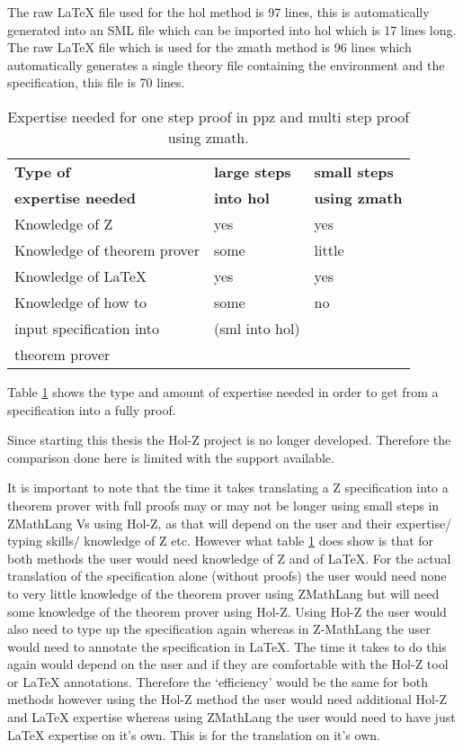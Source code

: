 The raw \LaTeX{} file used for the \gls{hol} method is 97 lines, this is
automatically generated into an SML file which can be imported into \gls{hol}
which is 17 lines long. The raw \LaTeX{} file which is used for the \gls{zmath}
method is 96 lines which automatically generates a single theory file containing
the environment and the specification, this file is 70 lines.

\begin{table}[H]
\begin{center}
\begin{tabular}{| l | l | l |}
\hline
\textbf{Type of} & \textbf{large steps} & \textbf{small steps} \\
\textbf{expertise needed} & \textbf{into \gls{hol}} & \textbf{using \gls{zmath}}
\\
\hline
\hline
Knowledge of Z &  yes & yes \\
\hline
Knowledge of theorem prover & some & little \\
\hline
Knowledge of \LaTeX & yes & yes \\
\hline
Knowledge of how to & some & no \\
input specification into &(sml into \gls{hol})&  \\
theorem prover &  &  \\
\hline
\end{tabular}
\end{center}
\caption{Expertise needed for one step proof in \gls{ppz} and multi step proof using \gls{zmath}.}
\label{tab:expertisebb}
\end{table}

Table \ref{tab:expertisebb} shows the type and amount of expertise needed in
order to get from a specification into a fully proof.

Since starting this thesis the Hol-Z project is no longer developed. Therefore the
comparison done here is limited with the support available.

It is important to note that the time it takes translating a Z specification into 
a theorem prover with full proofs may or may not be longer using small steps in ZMathLang Vs
using Hol-Z, as that will depend on the user and their expertise/ typing skills/
knowledge of Z etc.
However what table \ref{tab:expertisebb} does show is that for both methods the user would
need knowledge of Z and of \LaTeX{}. For the actual translation of the specification alone (without proofs) 
the user would need none to very little knowledge of the theorem prover using ZMathLang but will need some 
knowledge of the theorem prover using Hol-Z.
Using Hol-Z the user would also need to type up the specification again whereas in Z-MathLang the user
would need to annotate the specification in \LaTeX{}. The time it takes to do this again would
depend on the user and if they are comfortable with the Hol-Z tool or \LaTeX{} annotations.
Therefore the `efficiency' would be the same for both methods however using the Hol-Z method the user
would need additional Hol-Z and \LaTeX{} expertise whereas using ZMathLang the user would need to have just \LaTeX{} 
expertise on it's own. This is for the translation on it's own.

